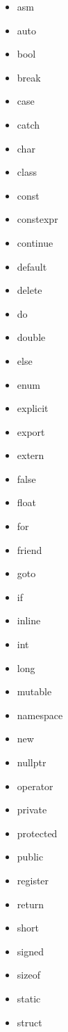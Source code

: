 \documentclass[10pt]{article}
\begin{document}
\begin{multicols}{3}
\begin{itemize}
    \item asm
    \item auto
    \item bool
    \item break
    \item case
    \item catch
    \item char
    \item class
    \item const
    \item constexpr
    \item continue
    \item default
    \item delete
    \item do
    \item double
    \item else
    \item enum
    \item explicit
    \item export
    \item extern
    \item false
    \item float
    \item for
    \item friend
    \item goto
    \item if
    \item inline
    \item int
    \item long
    \item mutable
    \item namespace
    \item new
    \item nullptr
    \item operator
    \item private
    \item protected
    \item public
    \item register
    \item return
    \item short
    \item signed
    \item sizeof
    \item static
    \item struct

\end{itemize}
\end{multicols}
\end{document}
